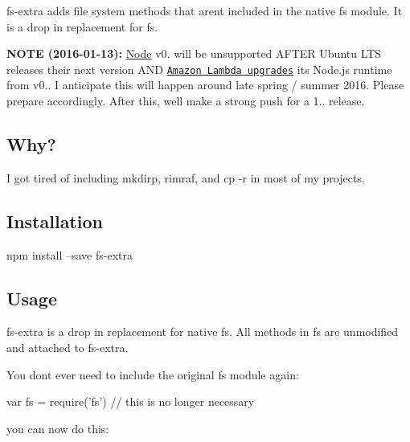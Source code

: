 \href{http://travis-ci.org/jprichardson/node-fs-extra}{\tt } \href{https://ci.appveyor.com/project/jprichardson/node-fs-extra/branch/master}{\tt } \href{https://www.npmjs.org/package/fs-extra}{\tt } \href{https://coveralls.io/r/jprichardson/node-fs-extra}{\tt }

{\ttfamily fs-\/extra} adds file system methods that aren\textquotesingle{}t included in the native {\ttfamily fs} module. It is a drop in replacement for {\ttfamily fs}.

{\bfseries N\+O\+TE (2016-\/01-\/13)\+:} \mbox{\hyperlink{classNode}{Node}} v0. will be unsupported A\+F\+T\+ER Ubuntu L\+TS releases their next version A\+ND \href{http://docs.aws.amazon.com/lambda/latest/dg/current-supported-versions.html}{\tt Amazon Lambda upgrades} its Node.\+js runtime from v0.. I anticipate this will happen around late spring / summer 2016. Please prepare accordingly. After this, we\textquotesingle{}ll make a strong push for a 1.. release.

\subsection*{Why? }

I got tired of including {\ttfamily mkdirp}, {\ttfamily rimraf}, and {\ttfamily cp -\/r} in most of my projects.

\subsection*{Installation }

\begin{DoxyVerb}npm install --save fs-extra
\end{DoxyVerb}


\subsection*{Usage }

{\ttfamily fs-\/extra} is a drop in replacement for native {\ttfamily fs}. All methods in {\ttfamily fs} are unmodified and attached to {\ttfamily fs-\/extra}.

You don\textquotesingle{}t ever need to include the original {\ttfamily fs} module again\+:


\begin{DoxyCode}
var fs = require('fs') // this is no longer necessary
\end{DoxyCode}


you can now do this\+:


